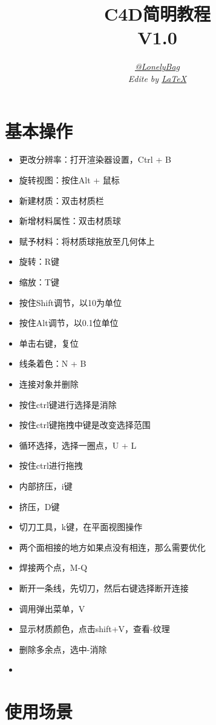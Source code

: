 \documentclass[UTF8,oneside]{ctexbook}
\title{{C4D简明教程}\\
\large{V1.0}}
\author{\href{https://github.com/lonelybag?tab=repositories}{\itshape{@LonelyBag}}\\ {\itshape \large{Edite by \href{https://mirrors.tuna.tsinghua.edu.cn/CTAN/systems/texlive/Images/}{\LaTeX}}}}
\begin{document}
\frontmatter
\maketitle
\tableofcontents
\mainmatter
\chapter{基本操作}
\begin{itemize}
    \item 更改分辨率：打开渲染器设置，Ctrl + B
    \item 旋转视图：按住Alt + 鼠标
    \item 新建材质：双击材质栏
    \item 新增材料属性：双击材质球
    \item 赋予材料：将材质球拖放至几何体上
    \item 旋转：R键
    \item 缩放：T键
    \item 按住Shift调节，以10为单位
    \item 按住Alt调节，以0.1位单位
    \item 单击右键，复位
    \item 线条着色：N + B
    \item 连接对象并删除
    \item 按住ctrl键进行选择是消除
    \item 按住ctrl键拖拽中键是改变选择范围
    \item 循环选择，选择一圈点，U + L
    \item 按住ctrl进行拖拽
    \item 内部挤压，i键
    \item 挤压，D键
    \item 切刀工具，k键，在平面视图操作
    \item 两个面相接的地方如果点没有相连，那么需要优化
    \item 焊接两个点，M-Q
    \item 断开一条线，先切刀，然后右键选择断开连接
    \item 调用弹出菜单，V
    \item 显示材质颜色，点击shift+V，查看-纹理
    \item 删除多余点，选中-消除
    \item 
\end{itemize}
\chapter{使用场景}
\end{document}
